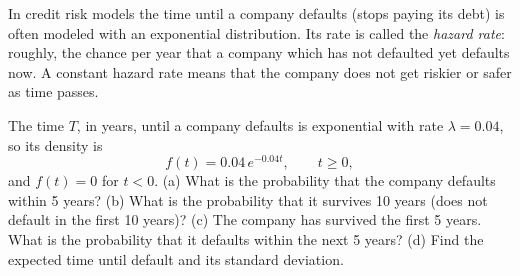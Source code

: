 
\begin{problem}
	\begin{context}
		In credit risk models the time until a company defaults (stops paying
		its debt) is often modeled with an exponential distribution. Its rate
		is called the \emph{hazard rate}: roughly, the chance per year that a
		company which has not defaulted yet defaults now. A constant hazard rate
		means that the company does not get riskier or safer as time passes.
	\end{context}
	The time $T$, in years, until a company defaults is exponential with rate
	$\lambda=0.04$, so its density is
	\[ f(t)=0.04\,e^{-0.04t},\qquad t\ge0, \]
	and $f(t)=0$ for $t<0$.
	(a) What is the probability that the company defaults within 5 years?
	(b) What is the probability that it survives 10 years (does not default
	in the first 10 years)?
	(c) The company has survived the first 5 years. What is the probability
	that it defaults within the next 5 years?
	(d) Find the expected time until default and its standard deviation.
\end{problem}

